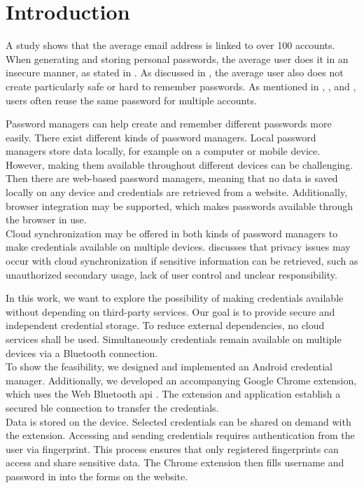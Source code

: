 \section{Introduction} \label{introduction}
A study \cite{DigitalGuardian} shows that the average email address is linked to over 100 accounts.
When generating and storing personal passwords, the average user does it in an insecure manner, as stated in \cite{pilar2012passwords}. As discussed in \cite{AdamsS99}, the average user also does not create particularly safe or hard to remember passwords. As mentioned in \cite{AdamsS99}, \cite{pilar2012passwords}, and \cite{Statista}, users often reuse the same password for multiple accounts.

Password managers can help create and remember different passwords more easily. There exist different kinds of password managers. Local password managers store data locally, for example on a computer or mobile device. However, making them available throughout different devices can be challenging. \\
Then there are web-based password managers, meaning that no data is saved locally on any device and credentials are retrieved from a website. Additionally, browser integration may be supported, which makes passwords available through the browser in use. \\
Cloud synchronization may be offered in both kinds of password managers to make credentials available on multiple devices. \cite{SainiM14} discusses that privacy issues may occur with cloud synchronization if sensitive information can be retrieved, such as unauthorized secondary usage, lack of user control and unclear responsibility.

In this work, we want to explore the possibility of making credentials available without depending on third-party services. Our goal is to provide secure and independent credential storage. To reduce external dependencies, no cloud services shall be used. Simultaneously credentials remain available on multiple devices via a Bluetooth connection. \\
To show the feasibility, we designed and implemented an Android credential manager. Additionally, we developed an accompanying Google Chrome extension, which uses the Web Bluetooth \gls{api} \cite{WebBTAPI}. The extension and application establish a secured \gls{ble} connection to transfer the credentials. \\
Data is stored on the device. Selected credentials can be shared on demand with the extension. Accessing and sending credentials requires authentication from the user via fingerprint. This process ensures that only registered fingerprints can access and share sensitive data. 
The Chrome extension then fills username and password in into the forms on the website. \\

